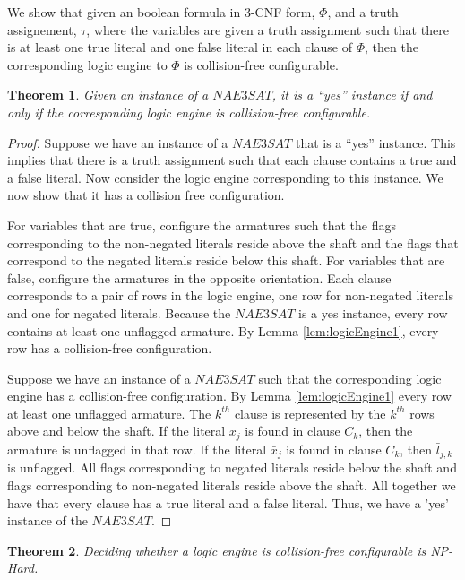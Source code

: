 \documentclass[10pt]{CSUNthesis}
\theoremstyle{plain}%
\newtheorem{thm}{Theorem}
\theoremstyle{definition}
\theoremstyle{remark}
\begin{document}
We show that given an boolean formula in 3-CNF form, $\Phi$, and a truth assignement, $\tau$, where the variables are given a truth assignment such that there is at least one true literal and one false literal in each clause of $\Phi$, then the corresponding logic engine to $\Phi$ is collision-free configurable.
\begin{thm}\label{thm:LogicEngineV3-1}
 Given an instance of a $NAE3SAT$,  it is a ``yes'' instance if and only if the corresponding logic 
engine is collision-free configurable.
\end{thm}
\begin{proof}
Suppose we have an instance of a $NAE3SAT$ that is a ``yes'' instance. This implies that there is a 
truth assignment such that each clause contains a true and a false literal. Now consider the logic 
engine corresponding to this instance. We now 
show that it has a collision free configuration.

For variables that are true, configure the armatures such that the flags corresponding to the 
non-negated literals reside above the 
shaft and the flags that correspond to the negated literals reside below this shaft.  For variables 
that are false, configure the 
armatures in the opposite orientation.  Each clause corresponds to a pair of rows in 
the logic engine, one row for non-negated literals and one for negated literals.  Because the 
$NAE3SAT$ is a yes instance, every row contains at least one unflagged armature.  
By Lemma \ref{lem:logicEngine1}, every row  has a collision-free configuration.

Suppose we have an instance of a $NAE3SAT$ such that the corresponding logic engine has a 
collision-free configuration. By Lemma \ref{lem:logicEngine1} every row at least one unflagged 
armature.  The $k^{th}$ clause is represented by the $k^{th}$ rows above and below the shaft. If the 
literal $x_j$ is found in clause $C_k$, then the armature is unflagged in that row. If the literal 
$\bar{x}_j$ is found in clause $C_k$, then $\bar{l}_{j,k}$ is unflagged.  All flags 
corresponding to negated literals reside below the shaft and flags corresponding to non-negated 
literals reside above the shaft.  All together we have that every clause has a true literal and a 
false literal.  Thus, we have a 'yes' instance of the $NAE3SAT$.
\end{proof}
\begin{thm}\label{thm:LogicEngineV3-2}
Deciding whether a logic engine is collision-free configurable is NP-Hard.
\end{thm}
\end{document}
